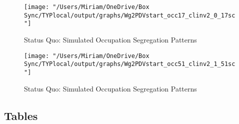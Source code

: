\documentclass[12pt]{article}
\begin{document}
%
%
%

% 

\begin{figure}[H]
\centering
\caption{Status Quo: Simulated Occupation Segregation Patterns}
\label{nurses}
\texttt{[image: "/Users/Miriam/OneDrive/Box Sync/TYPlocal/output/graphs/Wg2PDVstart\_occ17\_clinv2\_0\_17sc"]}
\end{figure}
\begin{figure}[H]
\centering
\caption{Status Quo: Simulated Occupation Segregation Patterns}
\label{mechanics}
\texttt{[image: "/Users/Miriam/OneDrive/Box Sync/TYPlocal/output/graphs/Wg2PDVstart\_occ51\_clinv2\_1\_51sc"]}
\end{figure}


\newpage
\subsection{Tables}



%
%
\end{document}
